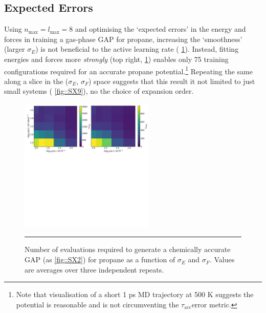 \documentclass[11pt]{article}
\numberwithin{equation}{subsection}
\newcommand{\tacc}{$\tau_\text{acc}$}
\newcommand{\comment}[1]{}
\begin{document}
\clearpage
\subsection{Expected Errors}

\comment{
	TJW: What do you mean by expected errors?
}

Using $n_\text{max} = l_\text{max} = 8$ and optimising the `expected errors' in the energy and forces in training a gas-phase GAP for propane, increasing the `smoothness' (larger $\sigma_E$) is not beneficial to the active learning rate (\figurename{ \ref{fig::SX7}}). Instead, fitting energies and forces more \emph{strongly} (top right, \figurename{ \ref{fig::SX7}}) enables only 75 training configurations required for an accurate propane potential.\footnote{Note that visualisation of a short 1 ps MD trajectory at 500 K suggests the potential is reasonable and is not circumventing the \tacc error metric.} Repeating the same along a slice in the ($\sigma_E$,  $\sigma_F$) space suggests that this result it not limited to just small systems (\figurename{ \ref{fig::SX9}}), no the choice of expansion order.


\begin{figure}[h!]
	\centering
	\vspace{0.4cm}
	\includegraphics[height=6.4cm]{figSX7.pdf}
	\vspace{0.2cm}
	\hrule
	\vspace{0.1cm}
	\caption{Number of evaluations required to generate a chemically accurate GAP (as \figurename{ \ref{fig::SX2}}) for propane as a function of $\sigma_E$ and $\sigma_F$. Values are averages over three independent repeats.}
	\label{fig::SX7}
\end{figure}
\end{document}
